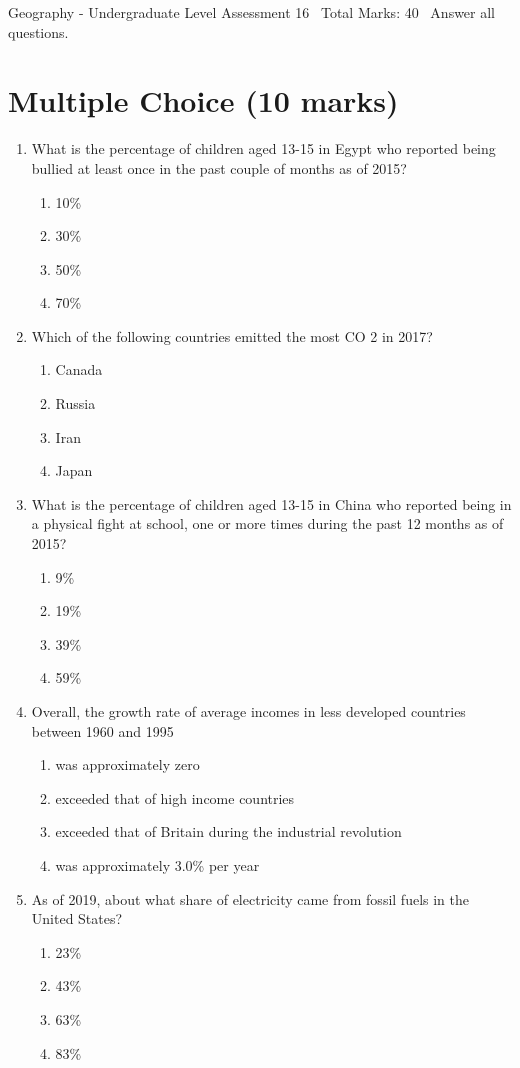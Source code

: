 \documentclass[12pt]{article}
\begin{document}
\begin{center}
Geography - Undergraduate Level Assessment 16 \
Total Marks: 40 \
Answer all questions.
\end{center}

\section*{Multiple Choice (10 marks)}
\begin{enumerate}[label=\arabic*.]
\item What is the percentage of children aged 13-15 in Egypt who reported being bullied at least once in the past couple of months as of 2015?
\begin{enumerate}[label=(\alph*)]
    \item 10\%
    \item 30\%
    \item 50\%
    \item 70\%
\end{enumerate}
\item Which of the following countries emitted the most CO 2 in 2017?
\begin{enumerate}[label=(\alph*)]
    \item Canada
    \item Russia
    \item Iran
    \item Japan
\end{enumerate}
\item What is the percentage of children aged 13-15 in China who reported being in a physical fight at school, one or more times during the past 12 months as of 2015?
\begin{enumerate}[label=(\alph*)]
    \item 9\%
    \item 19\%
    \item 39\%
    \item 59\%
\end{enumerate}
\item Overall, the growth rate of average incomes in less developed countries between 1960 and 1995
\begin{enumerate}[label=(\alph*)]
    \item was approximately zero
    \item exceeded that of high income countries
    \item exceeded that of Britain during the industrial revolution
    \item was approximately 3.0\% per year
\end{enumerate}
\item As of 2019, about what share of electricity came from fossil fuels in the United States?
\begin{enumerate}[label=(\alph*)]
    \item 23\%
    \item 43\%
    \item 63\%
    \item 83\%
\end{enumerate}
\end{enumerate}
\end{document}
